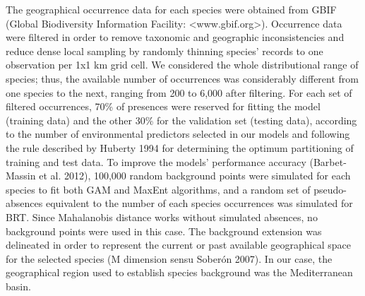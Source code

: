 \documentclass[11pt,twoside]{reedthesis}
\begin{document}
The geographical occurrence data for each species were obtained from
GBIF (Global Biodiversity Information Facility:
\textless{}www.gbif.org\textgreater{}). Occurrence data were filtered in
order to remove taxonomic and geographic inconsistencies and reduce
dense local sampling by randomly thinning species' records to one
observation per 1x1 km grid cell. We considered the whole distributional
range of species; thus, the available number of occurrences was
considerably different from one species to the next, ranging from 200 to
6,000 after filtering. For each set of filtered occurrences, 70\% of
presences were reserved for fitting the model (training data) and the
other 30\% for the validation set (testing data), according to the
number of environmental predictors selected in our models and following
the rule described by Huberty 1994 for determining the optimum
partitioning of training and test data. To improve the models'
performance accuracy (Barbet-Massin et al. 2012), 100,000 random
background points were simulated for each species to fit both GAM and
MaxEnt algorithms, and a random set of pseudo-absences equivalent to the
number of each species occurrences was simulated for BRT. Since
Mahalanobis distance works without simulated absences, no background
points were used in this case. The background extension was delineated
in order to represent the current or past available geographical space
for the selected species (M dimension sensu Soberón 2007). In our case,
the geographical region used to establish species background was the
Mediterranean basin.\par
\end{document}
